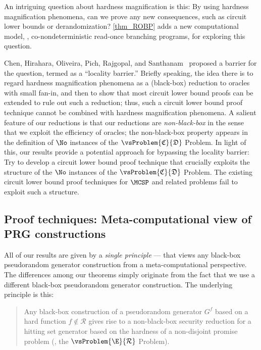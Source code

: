 \documentclass{toc}
\begin{document}
An intriguing question about hardness magnification is this:
By using hardness magnification phenomena,
can we prove any new consequences, such as
circuit lower bounds or derandomization?
%
\cref{thm_ROBP} adds a new computational model, \ie, co-nondeterministic read-once branching programs,
for exploring this question.

Chen, Hirahara, Oliveira, Pich, Rajgopal, and Santhanam~\cite{ChenHOPRS20_innovations_conf}
proposed a barrier for the question, termed as a ``locality barrier.''
Briefly speaking, the idea there is to regard hardness magnification phenomena
as a (black-box) reduction to oracles with small fan-in,
and then to show that most circuit lower bound proofs can be extended to rule
out such a reduction;
thus, such a circuit lower bound proof technique cannot be combined
with hardness magnification phenomena.
A salient feature of our reductions is that our reductions are \emph{non-black-box}
in the sense that we exploit the efficiency of oracles;
the non-black-box property appears in the definition of $\No$ instances of the $\vsProblem{\mathfrak{C}}{\mathfrak{D}}$ Problem.
In light of this,
our results provide a potential approach for bypassing the locality barrier:
Try to develop a circuit lower bound proof technique that crucially exploits
the structure of the $\No$ instances of  the $\vsProblem{\mathfrak{C}}{\mathfrak{D}}$ Problem.
The existing circuit lower bound proof techniques for $\MCSP$ and related problems fail to exploit such a structure.

%

%
%



%
%
%
%
%
%
%
%
%
%
%
%
%
%
%
%
%
%
%
%
%
%
%
%
%
%
%
%
%
%
%
%
%
%
%


\subsection{Proof techniques: Meta-computational view of PRG constructions}
\label{subsection:proofsketch}

All of our results are given by a \emph{single principle} --- that views
any black-box pseudorandom generator construction from a meta-computational perspective.
The differences among our theorems simply originate from the fact that we use a different black-box pseudorandom generator construction.
The underlying principle is this:
%
%
%
%
%
%
%
\begin{quote}
  Any black-box construction of
  a pseudorandom generator $G^f$
  based on a hard function $f \not\in \mathcal{R}$
  gives rise to
  a non-black-box security reduction
  for a hitting set generator
  based on the hardness of a non-disjoint promise problem
  (\eg, the $\vsProblem{\E}{\mathcal{R}}$ Problem).
\end{quote}
\end{document}
